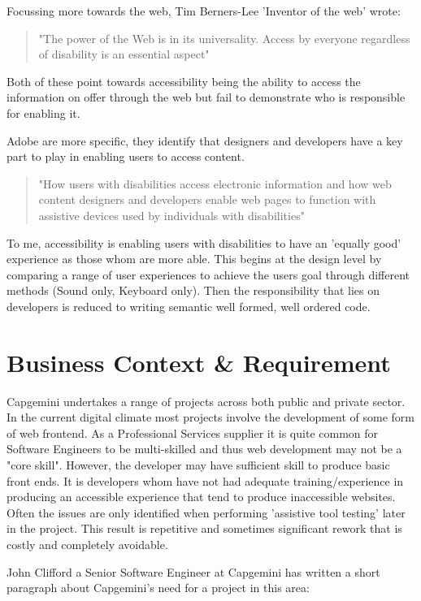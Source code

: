 Focussing more towards the web, Tim Berners-Lee 'Inventor of the web' wrote:
\begin{quote}
"The power of the Web is in its universality. Access by everyone regardless
of disability is an essential aspect"
\end{quote}

Both of these point towards accessibility being the ability to access the
information on offer through the web but fail to demonstrate who is
responsible for enabling it.

Adobe are more specific, they identify that designers and developers
 have a key part to play in enabling users to access content.

\begin{quote}
"How users with disabilities access electronic information and how web content
designers and developers enable web pages to function with assistive devices
used by individuals with disabilities"
\end{quote}

To me, accessibility is enabling users with disabilities to have an 'equally good'
experience as those whom are more able. This begins at the
design level by comparing a range of user experiences to achieve the users
goal through different methods (Sound only, Keyboard only). Then the
responsibility that lies on developers is reduced to writing semantic well formed,
well ordered code.


\section{Business Context \& Requirement}
Capgemini undertakes a range of projects across both public and private
sector. In the current digital climate most projects involve the
development of some form of web frontend. As a Professional Services supplier it
 is quite common for Software Engineers to be multi-skilled and thus web
 development may not be a "core skill". However, the developer may have
 sufficient skill to produce basic front ends. It is developers whom have
 not had adequate training/experience in producing an accessible experience
 that tend to produce inaccessible websites.
 Often the issues are only identified when performing 'assistive tool
 testing' later in the project. This result is repetitive and sometimes
 significant rework that is costly and completely avoidable.

John Clifford a Senior Software Engineer at Capgemini has written a short
paragraph about Capgemini's need for a project in this area:
\begin{quote}
\end{quote}


